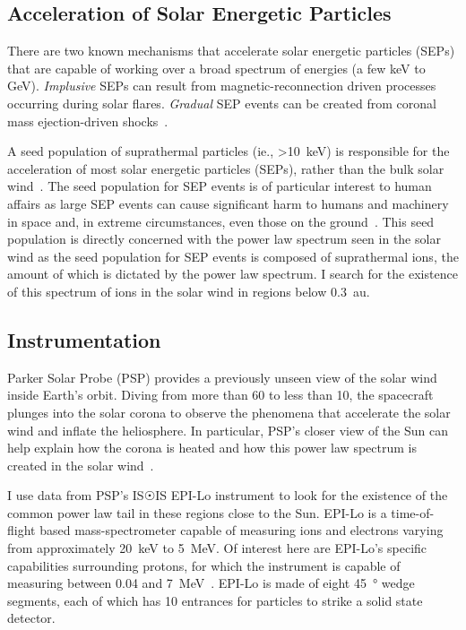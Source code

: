 \documentclass[letterpaper,11pt]{article}
\begin{document}
\subsection{Acceleration of Solar Energetic Particles}
There are two known mechanisms that accelerate solar energetic particles (SEPs) that are capable of working over a broad spectrum of energies (a few \si{\kilo\electronvolt} to \si{\giga\electronvolt}).  \textit{Implusive} SEPs can result from magnetic-reconnection driven processes occurring during solar flares.  \textit{Gradual} SEP events can be created from coronal mass ejection-driven shocks~\citep{Desai2016}.  

A seed population of suprathermal particles (ie., \SI{>10}{\kilo\electronvolt}) is responsible for the acceleration of most solar energetic particles (SEPs), rather than the bulk solar wind~\citep{Mewaldt2012}.  The seed population for SEP events is of particular interest to human affairs as large SEP events can cause significant harm to humans and machinery in space and, in extreme circumstances, even those on the ground~\citep{Desai2016}.  This seed population is directly concerned with the power law spectrum seen in the solar wind as the seed population for SEP events is composed of suprathermal ions, the amount of which is dictated by the power law spectrum.  I search for the existence of this spectrum of ions in the solar wind in regions below \SI{0.3}{\astronomicalunit}.

\subsection{Instrumentation}
\label{sec:intro:instrumentation}
Parker Solar Probe (PSP) provides a previously unseen view of the solar wind inside Earth's orbit.  Diving from more than 60 to less than \SI{10}{\solarradius}, the spacecraft plunges into the solar corona to observe the phenomena that accelerate the solar wind and inflate the heliosphere.  In particular, PSP's closer view of the Sun can help explain how the corona is heated and how this power law spectrum is created in the solar wind~\citep{McComas2014,McComas2007}.

I use data from PSP's IS$\Sun$IS EPI-Lo instrument to look for the existence of the common power law tail in these regions close to the Sun.  EPI-Lo is a time-of-flight based mass-spectrometer capable of measuring ions and electrons varying from approximately \SI{20}{\kilo\electronvolt} to \SI{5}{\mega\electronvolt}.  Of interest here are EPI-Lo's specific capabilities surrounding protons, for which the instrument is capable of measuring between 0.04 and \SI{7}{\mega\electronvolt}~\citep{McComas2014}.  EPI-Lo is made of eight \SI{45}{\degree} wedge segments, each of which has 10 entrances for particles to strike a solid state detector.
\end{document}
